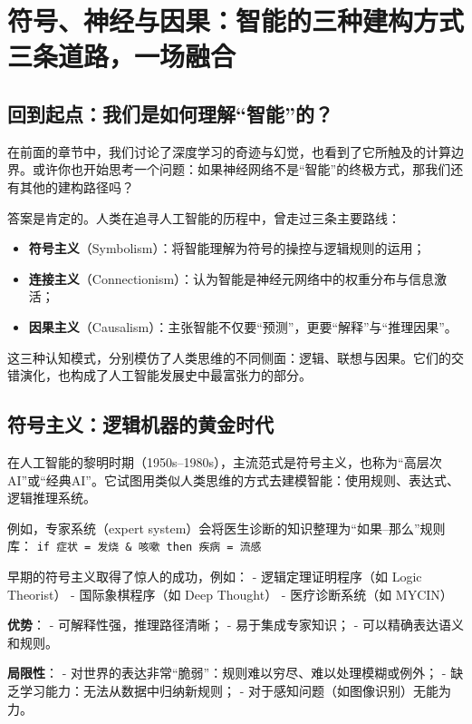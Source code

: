 
\chapter{符号、神经与因果：智能的三种建构方式\\\large{}三条道路，一场融合}

\section*{回到起点：我们是如何理解“智能”的？}

在前面的章节中，我们讨论了深度学习的奇迹与幻觉，也看到了它所触及的计算边界。或许你也开始思考一个问题：如果神经网络不是“智能”的终极方式，那我们还有其他的建构路径吗？

答案是肯定的。人类在追寻人工智能的历程中，曾走过三条主要路线：

\begin{itemize}
\item \textbf{符号主义}（Symbolism）：将智能理解为符号的操控与逻辑规则的运用；
\item \textbf{连接主义}（Connectionism）：认为智能是神经元网络中的权重分布与信息激活；
\item \textbf{因果主义}（Causalism）：主张智能不仅要“预测”，更要“解释”与“推理因果”。
\end{itemize}

这三种认知模式，分别模仿了人类思维的不同侧面：逻辑、联想与因果。它们的交错演化，也构成了人工智能发展史中最富张力的部分。

\section*{符号主义：逻辑机器的黄金时代}

在人工智能的黎明时期（1950s–1980s），主流范式是符号主义，也称为“高层次AI”或“经典AI”。它试图用类似人类思维的方式去建模智能：使用规则、表达式、逻辑推理系统。

例如，专家系统（expert system）会将医生诊断的知识整理为“如果–那么”规则库：  
\texttt{if 症状 = 发烧 \& 咳嗽 then 疾病 = 流感}

早期的符号主义取得了惊人的成功，例如：
- 逻辑定理证明程序（如 Logic Theorist）
- 国际象棋程序（如 Deep Thought）
- 医疗诊断系统（如 MYCIN）

\textbf{优势}：
- 可解释性强，推理路径清晰；
- 易于集成专家知识；
- 可以精确表达语义和规则。

\textbf{局限性}：
- 对世界的表达非常“脆弱”：规则难以穷尽、难以处理模糊或例外；
- 缺乏学习能力：无法从数据中归纳新规则；
- 对于感知问题（如图像识别）无能为力。

